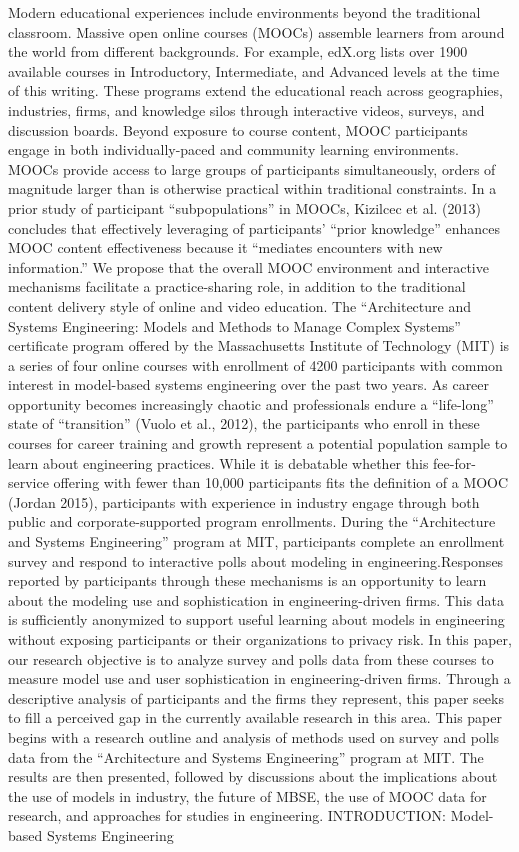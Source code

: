 Modern educational experiences include environments beyond the traditional classroom. Massive open online courses (MOOCs) assemble learners from around the world from different backgrounds. For example, edX.org lists over 1900 available courses in Introductory, Intermediate, and Advanced levels at the time of this writing. These programs extend the educational reach across geographies, industries, firms, and knowledge silos through interactive videos, surveys, and discussion boards. Beyond exposure to course content, MOOC participants engage in both individually-paced and community learning environments.
MOOCs provide access to large groups of participants simultaneously, orders of magnitude larger than is otherwise practical within traditional constraints. In a prior study of participant “subpopulations” in MOOCs, Kizilcec et al. (2013) concludes that effectively leveraging of participants’ “prior knowledge” enhances MOOC content effectiveness because it “mediates encounters with new information.” We propose that the overall MOOC environment and interactive mechanisms facilitate a practice-sharing role, in addition to the traditional content delivery style of online and video education.
The “Architecture and Systems Engineering: Models and Methods to Manage Complex Systems” certificate program offered by the Massachusetts Institute of Technology (MIT) is a series of four online courses with enrollment of 4200 participants with common interest in model-based systems engineering over the past two years. As career opportunity becomes increasingly chaotic and professionals endure a “life-long” state of “transition” (Vuolo et al., 2012), the participants who enroll in these courses for career training and growth represent a potential population sample to learn about engineering practices. While it is debatable whether this fee-for-service offering with fewer than 10,000 participants fits the definition of a MOOC (Jordan 2015), participants with experience in industry engage through both public and corporate-supported program enrollments.
During the “Architecture and Systems Engineering” program at MIT, participants complete an enrollment survey and respond to interactive polls about modeling in engineering.Responses reported by participants through these mechanisms is an opportunity to learn about the modeling use and sophistication in engineering-driven firms. This data is sufficiently anonymized to support useful learning about models in engineering without exposing participants or their organizations to privacy risk. In this paper, our research objective is to analyze survey and polls data from these courses to measure model use and user sophistication in engineering-driven firms. Through a descriptive analysis of participants and the firms they represent, this paper seeks to fill a perceived gap in the currently available research in this area.
This paper begins with a research outline and analysis of methods used on survey and polls data from the “Architecture and Systems Engineering” program at MIT. The results are then presented, followed by discussions about the implications about the use of models in industry, the future of MBSE, the use of MOOC data for research, and approaches for studies in engineering.
INTRODUCTION: Model-based Systems Engineering

